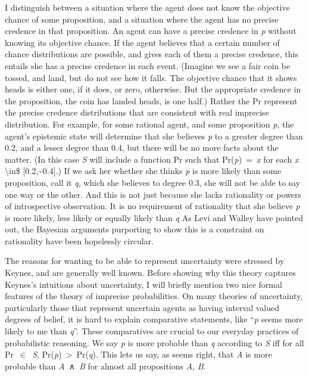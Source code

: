 \documentclass[
  10pt,
  letterpaper,
  DIV=11,
  numbers=noendperiod,
  twoside]{scrartcl}
\begin{document}
I distinguish between a situation where the agent does not know the
objective chance of some proposition, and a situation where the agent
has no precise credence in that proposition. An agent can have a precise
credence in \emph{p} without knowing its objective chance. If the agent
believes that a certain number of chance distributions are possible, and
gives each of them a precise credence, this entails she has a precise
credence in each event. (Imagine we see a fair coin be tossed, and land,
but do not see how it falls. The objective chance that it shows heads is
either one, if it does, or zero, otherwise. But the appropriate credence
in the proposition, the coin has landed heads, is one half.) Rather the
Pr represent the precise credence distributions that are consistent with
real imprecise distribution. For example, for some rational agent, and
some proposition \emph{p}, the agent's epistemic state will determine
that she believes \emph{p} to a greater degree than 0.2, and a lesser
degree than 0.4, but there will be no more facts about the matter. (In
this case \emph{S} will include a function Pr such that
Pr(\emph{p})~=~\emph{x} for each \emph{x} \textbackslash in\$
{[}0.2,\textasciitilde0.4{]}.) If we ask her whether she thinks \emph{p}
is more likely than some proposition, call it \emph{q}, which she
believes to degree 0.3, she will not be able to say one way or the
other. And this is not just because she lacks rationality or powers of
introspective observation. It is no requirement of rationality that she
believe \emph{p} is more likely, less likely or equally likely than
\emph{q} As Levi and Walley have pointed out, the Bayesian arguments
purporting to show this is a constraint on rationality have been
hopelessly circular.

The reasons for wanting to be able to represent uncertainty were
stressed by Keynes, and are generally well known. Before showing why
this theory captures Keynes's intuitions about uncertainty, I will
briefly mention two nice formal features of the theory of imprecise
probabilities. On many theories of uncertainty, particularly those that
represent uncertain agents as having interval valued degrees of belief,
it is hard to explain comparative statements, like ``\emph{p} seems more
likely to me than \emph{q}''. These comparatives are crucial to our
everyday practices of probabilistic reasoning. We say \emph{p} is more
probable than \emph{q} according to \emph{S} iff for all
Pr~\(\in\)~\emph{S}, Pr(\emph{p})~\textgreater~Pr(\emph{q}). This lets
us say, as seems right, that \emph{A} is more probable than
\emph{A}~∧~\emph{B} for almost all propositions \emph{A}, \emph{B}.
\end{document}
